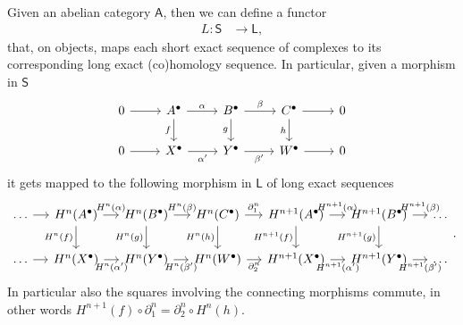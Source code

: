 \begin{prop}
	Given an abelian category $\mathsf{A}$, then we can define a functor
	\begin{align}
		L: \mathsf{S} &\to \mathsf{L}
	,\end{align} 
	that, on objects, maps each short exact sequence of complexes to its corresponding long exact
	(co)homology sequence.
	In particular, given a morphism in $\mathsf{S}$
	\begin{equation}
	\begin{tikzcd}
		0 \arrow[r, "", rightarrow] &
		A^\bullet \arrow[r, "\alpha", rightarrow] \arrow[d, "f"', rightarrow] &
		B^\bullet \arrow[r, "\beta", rightarrow] \arrow[d, "g"', rightarrow] &
		C^\bullet \arrow[r, "", rightarrow] \arrow[d, "h"', rightarrow] &
		0 \\
		0 \arrow[r, "", rightarrow] &
		X^\bullet \arrow[r, "\alpha'"', rightarrow] &
		Y^\bullet \arrow[r, "\beta'"', rightarrow] &
		W^\bullet \arrow[r, "", rightarrow] &
		0 
	\end{tikzcd}
	\end{equation} 
	it gets mapped to the following morphism in $\mathsf{L}$ of long exact sequences
	\begin{equation}
	\begin{tikzcd}[column sep = small]
		\ldots \arrow[r, "", rightarrow] &
		H^n(A^\bullet) \arrow[r, "H^n(\alpha)", rightarrow] \arrow[d, "H^n(f)"', rightarrow] &
		H^n(B^\bullet) \arrow[r, "H^n(\beta)", rightarrow] \arrow[d, "H^n(g)"', rightarrow] &
		H^n(C^\bullet) \arrow[r, "\partial_1^n", rightarrow] \arrow[d, "H^n(h)"', rightarrow] &
		H^{n+1}(A^\bullet) \arrow[r, "H^{n+1}(\alpha)", rightarrow] \arrow[d, "H^{n+1}(f)"', rightarrow] &
		H^{n+1}(B^\bullet) \arrow[r, "H^{n+1}(\beta)", rightarrow] \arrow[d, "H^{n+1}(g)"', rightarrow] &
		\ldots \\
		\ldots \arrow[r, "", rightarrow] &
		H^n(X^\bullet) \arrow[r, "H^n(\alpha')"', rightarrow] &
		H^n(Y^\bullet) \arrow[r, "H^n(\beta')"', rightarrow] &
		H^n(W^\bullet) \arrow[r, "\partial_2^n"', rightarrow] &
		H^{n+1}(X^\bullet) \arrow[r, "H^{n+1}(\alpha')"', rightarrow] &
		H^{n+1}(Y^\bullet) \arrow[r, "H^{n+1}(\beta')"', rightarrow] &
		\ldots 
	\end{tikzcd}
	.\end{equation} 
	In particular also the squares involving the connecting morphisms commute,
	in other words $H^{n+1}(f) \circ \partial_1^n = \partial_2^n \circ H^n(h)$.
\end{prop} 

